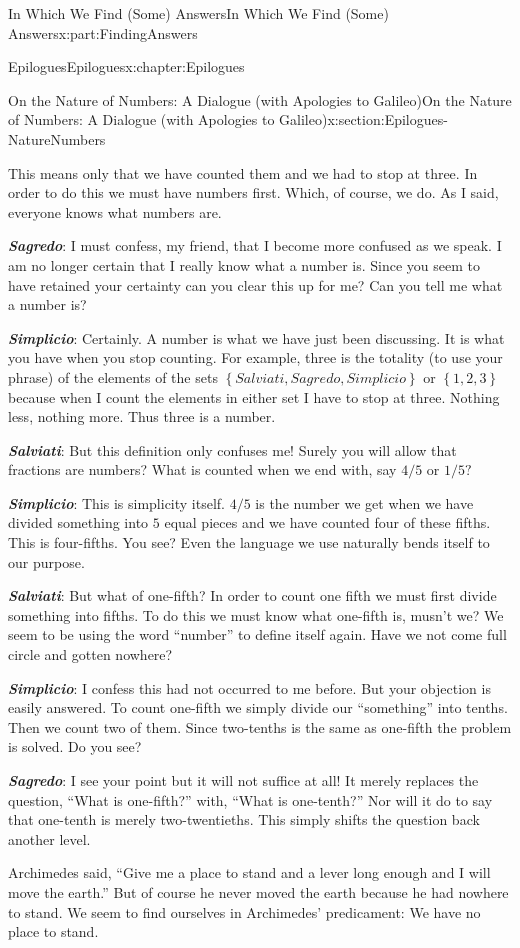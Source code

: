 \documentclass[oneside,10pt,]{book}
\newcommand{\alert}[1]{\textbf{\textit{#1}}}
\numberwithin{equation}{section}
\begin{document}
\begin{partptx}{In Which We Find (Some) Answers}{}{In Which We Find (Some) Answers}{}{}{x:part:FindingAnswers}
\begin{chapterptx}{Epilogues}{}{Epilogues}{}{}{x:chapter:Epilogues}
\begin{sectionptx}{On the Nature of Numbers: A Dialogue (with Apologies to Galileo)}{}{On the Nature of Numbers: A Dialogue (with Apologies to Galileo)}{}{}{x:section:Epilogues-NatureNumbers}
\begin{introduction}{}
\par
This means only that we have counted them and we had to stop at three. In order to do this we must have numbers first. Which, of course, we do. As I said, everyone knows what numbers are.%
\par
\alert{Sagredo}:  I must confess, my friend, that I become more confused as we speak. I am no longer certain that I really know what a number is. Since you seem to have retained your certainty can you clear this up for me? Can you tell me what a number is?%
\par
\alert{Simplicio}:  Certainly. A number is what we have just been discussing. It is what you have when you stop counting. For example, three is the totality (to use your phrase) of the elements of the sets \(\left\{Salviati, Sagredo, Simplicio\right\}\) or \(\left\{1, 2, 3\right\}\) because when I count the elements in either set I have to stop at three. Nothing less, nothing more. Thus three is a number.%
\par
\alert{Salviati}:  But this definition only confuses me! Surely you will allow that fractions are numbers? What is counted when we end with, say \(4/5\) or \(1/5?\)%
\par
\alert{Simplicio}:  This is simplicity itself. \(4/5\) is the number we get when we have divided something into \(5\) equal pieces and we have counted four of these fifths. This is four-fifths. You see? Even the language we use naturally bends itself to our purpose.%
\par
\alert{Salviati}:  But what of one-fifth? In order to count one fifth we must first divide something into fifths. To do this we must know what one-fifth is, musn't we? We seem to be using the word ``number'' to define itself again. Have we not come full circle and gotten nowhere?%
\par
\alert{Simplicio}:  I confess this had not occurred to me before. But your objection is easily answered. To count one-fifth we simply divide our ``something'' into tenths. Then we count two of them. Since two-tenths is the same as one-fifth the problem is solved. Do you see?%
\par
\alert{Sagredo}:  I see your point but it will not suffice at all! It merely replaces the question, ``What is one-fifth?'' with, ``What is one-tenth?'' Nor will it do to say that one-tenth is merely two-twentieths. This simply shifts the question back another level.%
\par
Archimedes said, ``Give me a place to stand and a lever long enough and I will move the earth.'' But of course he never moved the earth because he had nowhere to stand. We seem to find ourselves in Archimedes' predicament: We have no place to stand.%

\end{introduction}
\end{sectionptx}
\end{chapterptx}
\end{partptx}
\end{document}

